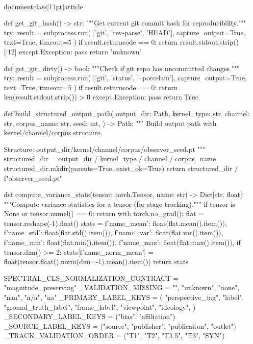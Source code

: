 \\documentclass[11pt]{article}
\begin{document}
\begin{CodeBlock}
def get_git_hash() -> str:
    """Get current git commit hash for reproducibility."""
    try:
        result = subprocess.run(
            ['git', 'rev-parse', 'HEAD'],
            capture_output=True, text=True, timeout=5
        )
        if result.returncode == 0:
            return result.stdout.strip()[:12]
    except Exception:
        pass
    return 'unknown'


def get_git_dirty() -> bool:
    """Check if git repo has uncommitted changes."""
    try:
        result = subprocess.run(
            ['git', 'status', '--porcelain'],
            capture_output=True, text=True, timeout=5
        )
        if result.returncode == 0:
            return len(result.stdout.strip()) > 0
    except Exception:
        pass
    return True


def build_structured_output_path(
    output_dir: Path,
    kernel_type: str,
    channel: str,
    corpus_name: str,
    seed: int,
) -> Path:
    """
    Build output path with kernel/channel/corpus structure.
    
    Structure: output_dir/kernel/channel/corpus/observer_{seed}.pt
    """
    structured_dir = output_dir / kernel_type / channel / corpus_name
    structured_dir.mkdir(parents=True, exist_ok=True)
    return structured_dir / f"observer_{seed}.pt"


def compute_variance_stats(tensor: torch.Tensor, name: str) -> Dict[str, float]:
    """Compute variance statistics for a tensor (for stage tracking)."""
    if tensor is None or tensor.numel() == 0:
        return {}
    with torch.no_grad():
        flat = tensor.reshape(-1).float()
        stats = {
            f'{name}_mean': float(flat.mean().item()),
            f'{name}_std': float(flat.std().item()),
            f'{name}_var': float(flat.var().item()),
            f'{name}_min': float(flat.min().item()),
            f'{name}_max': float(flat.max().item()),
        }
        if tensor.dim() >= 2:
            stats[f'{name}_norm_mean'] = float(tensor.float().norm(dim=-1).mean().item())
        return stats


SPECTRAL_CLS_NORMALIZATION_CONTRACT = "magnitude_preserving"
_VALIDATION_MISSING = {"", "unknown", "none", "nan", "n/a", "na"}
_PRIMARY_LABEL_KEYS = (
    "perspective_tag",
    "label",
    "ground_truth_label",
    "frame_label",
    "viewpoint",
    "ideology",
)
_SECONDARY_LABEL_KEYS = ("bias", "affiliation")
_SOURCE_LABEL_KEYS = ("source", "publisher", "publication", "outlet")
_TRACK_VALIDATION_ORDER = ("T1", "T2", "T1.5", "T3", "SYN")



\end{CodeBlock}
\end{document}
